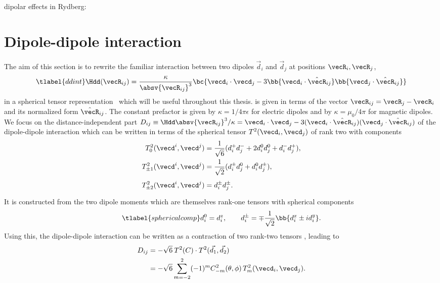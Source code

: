 dipolar effects in Rydberg: \cite{Westermann2006,Nipper2012b}


\section{Dipole-dipole interaction}
The aim of this section is to rewrite the familiar interaction between two dipoles $\vec{d}_i$ and $\vec{d}_j$ at positions $\vecR_i, \vecR_j$,
\begin{align} \tlabel{ddint}
\Hdd(\vecR_{ij}) = \frac{\kappa}{\absv{\vecR_{ij}}^3} \bc{ \vecd_i \cdot \vecd_j -3 \bb{ \vecd_i \cdot \hat{\vecR}_{ij} }\bb{ \vecd_j \cdot \hat{\vecR}_{ij} } }
\end{align}
in a spherical tensor representation~\cite{Micheli2007,Gorshkov2011c} which will be useful throughout this thesis.
 is given in terms of the vector $\vecR_{ij} = \vecR_j - \vecR_i$ and its normalized form $\hat{\vecR}_{ij}$.
The constant prefactor is given by $\kappa = 1/4\pi\epsilon$ for electric dipoles and by
$\kappa = \mu_0 / 4\pi$ for magnetic dipoles.
We focus on the distance-independent part $D_{ij} \equiv \Hdd \absv{\vecR_{ij}}^3/\kappa=\vecd_i \cdot \vecd_j -3 (\vecd_i \cdot \hat{\vecR}_{ij})(\vecd_j \cdot \hat{\vecR}_{ij})$ of the dipole-dipole interaction which can be written in terms of the spherical tensor $T^2(\vecd_i, \vecd_j)$ of rank two with components
\begin{align}
T^2_0(\vecd^i, \vecd^j) &= \frac{1}{\sqrt{6}} (d_i^+ d_j^- + 2d_i^0 d_j^0 + d_i^{-} d_j^{+}), \\
T^2_{\pm 1}(\vecd^i, \vecd^j) &= \frac{1}{\sqrt{2}} (d_i^{\pm} d_j^0 + d_i^0 d_j^{\pm}), \\
T^2_{\pm 2}(\vecd^i, \vecd^j) &= d_i^{\pm} d_j^{\pm} \vphantom{\frac{1}{42}}.
\end{align}
It is constructed from the two dipole moments which are themselves rank-one tensors with spherical components
\begin{align} \tlabel{sphericalcomp}
d^0_i = d^z_i, \qquad d_i^\pm = \mp\frac{1}{\sqrt{2}}\bb{d_i^x\pm i d_i^y}.
\end{align}
Using this, the dipole-dipole interaction can be written as a contraction of two rank-two tensors \cite{Brown2003}, leading to
\begin{align}
    D_{ij} &= -\sqrt{6} \: T^2(C)\cdot T^2(\vec{d_1},\vec{d_2})\\
           &= -\sqrt{6}  \sum_{m=-2}^{2} (-1)^m C^2_{-m}(\theta,\phi) \, T^2_m(\vecd_i,\vecd_j).
\end{align}

